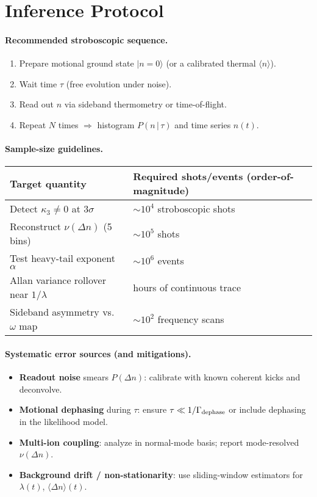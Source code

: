\section{Inference Protocol}

\paragraph{Recommended stroboscopic sequence.}
\begin{enumerate}\itemsep0.2em
  \item Prepare motional ground state $\lvert n=0\rangle$ (or a calibrated thermal $\langle n\rangle$).
  \item Wait time $\tau$ (free evolution under noise).
  \item Read out $n$ via sideband thermometry or time-of-flight.
  \item Repeat $N$ times $\Rightarrow$ histogram $P(n\,|\,\tau)$ and time series $n(t)$.
\end{enumerate}

\paragraph{Sample-size guidelines.}
\begin{table}[h]
\centering
\renewcommand{\arraystretch}{1.15}
\begin{tabularx}{0.9\textwidth}{>{\raggedright\arraybackslash}X>{\raggedleft\arraybackslash}p{4.2cm}}
\hline
\textbf{Target quantity} & \textbf{Required shots/events (order-of-magnitude)} \\
\hline
Detect $\kappa_3 \neq 0$ at $3\sigma$ & $\sim 10^4$ stroboscopic shots \\
Reconstruct $\nu(\Delta n)$ (5 bins)  & $\sim 10^5$ shots \\
Test heavy-tail exponent $\alpha$      & $\sim 10^6$ events \\
Allan variance rollover near $1/\lambda$ & hours of continuous trace \\
Sideband asymmetry vs.\ $\omega$ map   & $\sim 10^2$ frequency scans \\
\hline
\end{tabularx}
\end{table}

\paragraph{Systematic error sources (and mitigations).}
\begin{itemize}\itemsep0.2em
  \item \textbf{Readout noise} smears $P(\Delta n)$: calibrate with known coherent kicks and deconvolve.
  \item \textbf{Motional dephasing} during $\tau$: ensure $\tau \ll 1/\Gamma_{\rm dephase}$ or include dephasing in the likelihood model.
  \item \textbf{Multi-ion coupling}: analyze in normal-mode basis; report mode-resolved $\nu(\Delta n)$.
  \item \textbf{Background drift / non-stationarity}: use sliding-window estimators for $\lambda(t)$, $\langle \Delta n \rangle(t)$.
\end{itemize}

